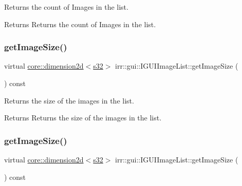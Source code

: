 Returns the count of Images in the list. 

\begin{DoxyReturn}{Returns}
Returns the count of Images in the list. 
\end{DoxyReturn}
\mbox{\label{classirr_1_1gui_1_1IGUIImageList_a5973353355625da76b24100f16f90539}} 
\subsubsection{\texorpdfstring{get\+Image\+Size()}{getImageSize()}\hspace{0.1cm}{\footnotesize\ttfamily [1/2]}}
{\footnotesize\ttfamily virtual \hyperlink{classirr_1_1core_1_1dimension2d}{core\+::dimension2d}$<$\hyperlink{namespaceirr_ac66849b7a6ed16e30ebede579f9b47c6}{s32}$>$ irr\+::gui\+::\+I\+G\+U\+I\+Image\+List\+::get\+Image\+Size (\begin{DoxyParamCaption}{ }\end{DoxyParamCaption}) const\hspace{0.3cm}{\ttfamily [pure virtual]}}



Returns the size of the images in the list. 

\begin{DoxyReturn}{Returns}
Returns the size of the images in the list. 
\end{DoxyReturn}
\mbox{\label{classirr_1_1gui_1_1IGUIImageList_a5973353355625da76b24100f16f90539}} 
\subsubsection{\texorpdfstring{get\+Image\+Size()}{getImageSize()}\hspace{0.1cm}{\footnotesize\ttfamily [2/2]}}
{\footnotesize\ttfamily virtual \hyperlink{classirr_1_1core_1_1dimension2d}{core\+::dimension2d}$<$\hyperlink{namespaceirr_ac66849b7a6ed16e30ebede579f9b47c6}{s32}$>$ irr\+::gui\+::\+I\+G\+U\+I\+Image\+List\+::get\+Image\+Size (\begin{DoxyParamCaption}{ }\end{DoxyParamCaption}) const\hspace{0.3cm}{\ttfamily [pure virtual]}}




